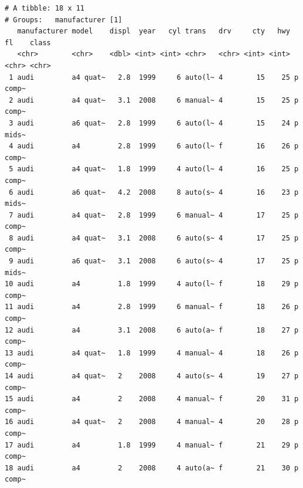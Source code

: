 \documentclass[
  11pt,
]{krantz}
\newenvironment{Shaded}{\begin{snugshade}}{\end{snugshade}}
\newcommand{\CommentTok}[1]{\textcolor[rgb]{0.37,0.37,0.37}{\textit{#1}}}
\newcommand{\KeywordTok}[1]{\textcolor[rgb]{0.27,0.27,0.27}{\textbf{#1}}}
\newcommand{\NormalTok}[1]{#1}
\newcommand{\OperatorTok}[1]{\textcolor[rgb]{0.43,0.43,0.43}{\textbf{#1}}}
\newcommand{\StringTok}[1]{\textcolor[rgb]{0.5,0.5,0.5}{#1}}
\begin{document}
\footnotesize

\begin{Shaded}
\end{Shaded}

\begin{verbatim}
# A tibble: 18 x 11
# Groups:   manufacturer [1]
   manufacturer model    displ  year   cyl trans   drv     cty   hwy fl    class
   <chr>        <chr>    <dbl> <int> <int> <chr>   <chr> <int> <int> <chr> <chr>
 1 audi         a4 quat~   2.8  1999     6 auto(l~ 4        15    25 p     comp~
 2 audi         a4 quat~   3.1  2008     6 manual~ 4        15    25 p     comp~
 3 audi         a6 quat~   2.8  1999     6 auto(l~ 4        15    24 p     mids~
 4 audi         a4         2.8  1999     6 auto(l~ f        16    26 p     comp~
 5 audi         a4 quat~   1.8  1999     4 auto(l~ 4        16    25 p     comp~
 6 audi         a6 quat~   4.2  2008     8 auto(s~ 4        16    23 p     mids~
 7 audi         a4 quat~   2.8  1999     6 manual~ 4        17    25 p     comp~
 8 audi         a4 quat~   3.1  2008     6 auto(s~ 4        17    25 p     comp~
 9 audi         a6 quat~   3.1  2008     6 auto(s~ 4        17    25 p     mids~
10 audi         a4         1.8  1999     4 auto(l~ f        18    29 p     comp~
11 audi         a4         2.8  1999     6 manual~ f        18    26 p     comp~
12 audi         a4         3.1  2008     6 auto(a~ f        18    27 p     comp~
13 audi         a4 quat~   1.8  1999     4 manual~ 4        18    26 p     comp~
14 audi         a4 quat~   2    2008     4 auto(s~ 4        19    27 p     comp~
15 audi         a4         2    2008     4 manual~ f        20    31 p     comp~
16 audi         a4 quat~   2    2008     4 manual~ 4        20    28 p     comp~
17 audi         a4         1.8  1999     4 manual~ f        21    29 p     comp~
18 audi         a4         2    2008     4 auto(a~ f        21    30 p     comp~
\end{verbatim}
\end{document}
